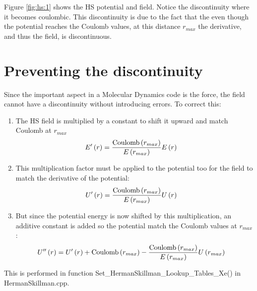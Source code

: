 \documentclass[12pt,letterpaper]{article}
\begin{document}
Figure \ref{fig:hs:1} shows the HS potential and field. Notice the discontinuity where it becomes
coulombic. This discontinuity is due to the fact that the even though the potential reaches the
Coulomb values, at this distance $r_{max}$ the derivative, and thus the field, is discontinuous.

\section{Preventing the discontinuity}
Since the important aspect in a Molecular Dynamics code is the force, the field cannot have a
discontinuity without introducing errors. To correct this:
\begin{enumerate}
\item The HS field is multiplied by a constant to shift it upward and match Coulomb at $r_{max}$
\begin{align}
E'\left( r \right) & = \frac{\textrm{Coulomb}\left( r_{max} \right)}{E\left( r_{max} \right)} E\left( r \right)
\end{align}
\item This multiplication factor must be applied to the potential too for the field to match the derivative of the potential:
\begin{align}
U'\left( r \right) & = \frac{\textrm{Coulomb}\left( r_{max} \right)}{E\left( r_{max} \right)} U\left( r \right)
\end{align}
\item But since the potential energy is now shifted by this multiplication, an additive constant is added so the potential match the Coulomb values at $r_{max}$:
\begin{align}
U''\left( r \right) & = U'\left( r \right) + \textrm{Coulomb}\left( r_{max} \right) - \frac{\textrm{Coulomb}\left( r_{max} \right)}{E\left( r_{max} \right)} U\left( r_{max} \right)
\end{align}
\end{enumerate}

This is performed in function Set\_HermanSkillman\_Lookup\_Tables\_Xe() in HermanSkillman.cpp.
\end{document}
